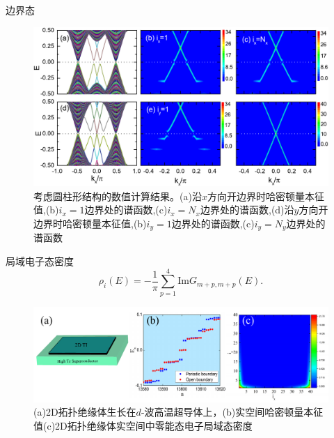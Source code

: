 \documentclass[10pt,aspectratio=169]{beamer} %
\begin{document}
\begin{frame}{边界态}
\begin{figure}[h]
	\centering
	\includegraphics[scale=0.5]{pic/fig18.pdf}
	\caption{考虑圆柱形结构的数值计算结果。(a)沿$x$方向开边界时哈密顿量本征值,(b)$i_x=1$边界处的谱函数,(c)$i_x=N_x$边界处的谱函数,(d)沿$y$方向开边界时哈密顿量本征值,(b)$i_y=1$边界处的谱函数,(c)$i_y=N_y$边界处的谱函数}\label{fig17}
\end{figure}
\end{frame}
\begin{frame}{局域电子态密度}
\begin{equation}
\rho_i(E)=-\frac{1}{\pi}\sum^4_{p=1}\mathrm{Im} G_{m+p,m+p}(E).
\end{equation}
\begin{figure}[h]
\centering
\includegraphics[scale=0.4]{pic/fig19}
\caption{(a)2D拓扑绝缘体生长在$d$-波高温超导体上，(b)实空间哈密顿量本征值(c)2D拓扑绝缘体实空间中零能态电子局域态密度}\label{fig18}
\end{figure}
\end{frame}
\end{document}
